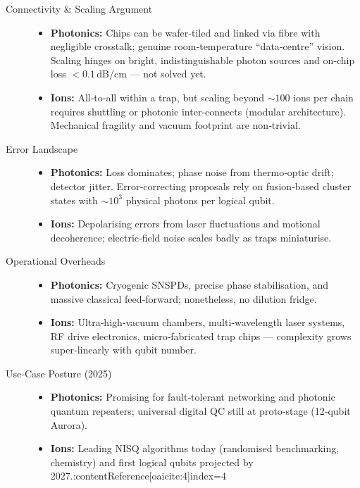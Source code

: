 \documentclass[11pt,a4paper]{article}
\begin{document}
\begin{description}
	\item[Connectivity \& Scaling Argument]
	\begin{itemize}
		\item \textbf{Photonics:} Chips can be wafer‑tiled and linked via fibre with negligible crosstalk; genuine room‑temperature “data‑centre” vision.  Scaling hinges on bright, indistinguishable photon sources and on‑chip loss $<\!0.1\,$dB/cm — not solved yet.
		\item \textbf{Ions:} All‑to‑all within a trap, but scaling beyond $\sim\!100$ ions per chain requires shuttling or photonic inter‑connects (modular architecture).  Mechanical fragility and vacuum footprint are non‑trivial.
	\end{itemize}
	
	\item[Error Landscape]
	\begin{itemize}
		\item \textbf{Photonics:} Loss dominates; phase noise from thermo‑optic drift; detector jitter.  Error‑correcting proposals rely on fusion‑based cluster states with $\sim\!10^{3}$ physical photons per logical qubit.
		\item \textbf{Ions:} Depolarising errors from laser fluctuations and motional decoherence; electric‑field noise scales badly as traps miniaturise.
	\end{itemize}
	
	\item[Operational Overheads]
	\begin{itemize}
		\item \textbf{Photonics:} Cryogenic SNSPDs, precise phase stabilisation, and massive classical feed‑forward; nonetheless, no dilution fridge.
		\item \textbf{Ions:} Ultra‑high‑vacuum chambers, multi‑wavelength laser systems, RF drive electronics, micro‑fabricated trap chips — complexity grows super‑linearly with qubit number.
	\end{itemize}
	
	\item[Use‑Case Posture (2025)]
	\begin{itemize}
		\item \textbf{Photonics:} Promising for fault‑tolerant networking and photonic quantum repeaters; universal digital QC still at proto‑stage (12‑qubit Aurora).
		\item \textbf{Ions:} Leading NISQ algorithms today (randomised benchmarking, chemistry) and first logical qubits projected by 2027.:contentReference[oaicite:4]{index=4}
	\end{itemize}
\end{description}
\end{document}
